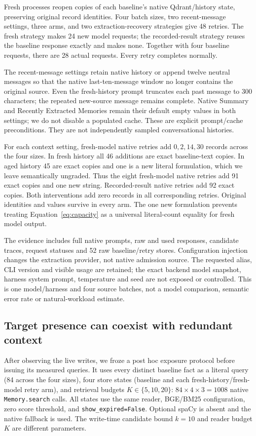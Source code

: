 Fresh processes reopen copies of each baseline's native Qdrant/history state, preserving original record identities. Four batch sizes, two recent-message settings, three arms, and two extraction-recovery strategies give 48 retries. The fresh strategy makes 24 new model requests; the recorded-result strategy reuses the baseline response exactly and makes none. Together with four baseline requests, there are 28 actual requests. Every retry completes normally.

The recent-message settings retain native history or append twelve neutral messages so that the native last-ten-message window no longer contains the original source. Even the fresh-history prompt truncates each past message to 300 characters; the repeated new-source message remains complete. Native Summary and Recently Extracted Memories remain their default empty values in both settings; we do not disable a populated cache. These are explicit prompt/cache preconditions. They are not independently sampled conversational histories.

For each context setting, fresh-model native retries add $0,2,14,30$ records across the four sizes. In fresh history all 46 additions are exact baseline-text copies. In aged history 45 are exact copies and one is a new literal formulation, which we leave semantically ungraded. Thus the eight fresh-model native retries add 91 exact copies and one new string. Recorded-result native retries add 92 exact copies. Both interventions add zero records in all corresponding retries. Original identities and values survive in every arm. The one new formulation prevents treating Equation~\ref{eq:capacity} as a universal literal-count equality for fresh model output.

The evidence includes full native prompts, raw and used responses, candidate traces, request statuses and 52 raw baseline/retry stores. Configuration injection changes the extraction provider, not native admission source. The requested alias, CLI version and visible usage are retained; the exact backend model snapshot, harness system prompt, temperature and seed are not exposed or controlled. This is one model/harness and four source batches, not a model comparison, semantic error rate or natural-workload estimate.

\subsection{Target presence can coexist with redundant context}
After observing the live writes, we froze a post hoc exposure protocol before issuing its measured queries. It uses every distinct baseline fact as a literal query (84 across the four sizes), four store states (baseline and each fresh-history/fresh-model retry arm), and retrieval budgets $K\in\{5,10,20\}$: $84\times4\times3=1008$ native \texttt{Memory.search} calls. All states use the same reader, BGE/BM25 configuration, zero score threshold, and \texttt{show\_expired=False}. Optional spaCy is absent and the native fallback is used. The write-time candidate bound $k=10$ and reader budget $K$ are different parameters.

